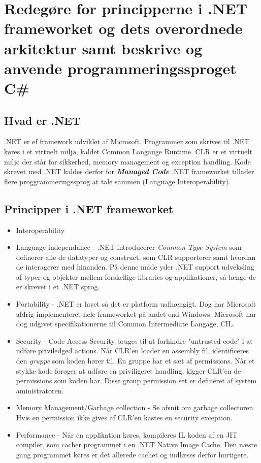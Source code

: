 \section{Redegøre for principperne i .NET frameworket og dets overordnede arkitektur samt beskrive og anvende programmeringssproget C\#}\label{sec:spm1}

\subsection{Hvad er .NET}

.NET er ef framework udviklet af Microsoft. Programmer som skrives til .NET køres i et virtuelt miljø, kaldet Common Langauge Runtime. CLR er et virtuelt miljø der står for sikkerhed, memory management og exception handling. Kode skrevet med .NET kaldes derfor for \textbf{\textit{Managed Code}} .NET frameworket tillader flere proggrammeringssprog at tale sammen (Language Interoperability).


\subsection{Principper i .NET frameworket}

\begin{itemize}
	\item Interoperability
	\item Language independance - .NET introducerer \textit{Common Type System} som definerer alle de datatyper og construct, som CLR supporterer samt hvordan de interagerer med hinanden. På denne måde yder .NET support udveksling af typer og objekter mellem forskellige libraries og applikationer, så længe de er skrevet i et .NET sprog. 
	\item Portability - .NET er lavet så det er platform uafhængigt. Dog har Microsoft aldrig implementeret hele frameworket på andet end Windows. Microsoft har dog udgivet specifikationerne til Common Intermediate Langage, CIL.
	\item Security - Code Access Security bruges til at forhindre "untrusted code" i at udføre priviledged actions. Når CLR'en loader en assembly fil, identificeres den \textit{gruppe} som koden hører til. En gruppe har et sæt af permissions. Når et stykke kode forøger at udføre en priviligeret handling, kigger CLR'en de permissions som koden har. Disse group permission set er defineret af system aministratoren.
	\item Memory Management/Garbage collection - Se afsnit om garbage collectoren. Hvis en permission ikke gives af CLR'en kastes en security exception.
	\item Performance - Når en applikation køres, kompileres IL koden af en JIT compiler, som cacher programmet i en .NET Native Image Cache. Den næste gang programmet køres er det allerede cachet og indlæses derfor hurtigere.
\end{itemize}

